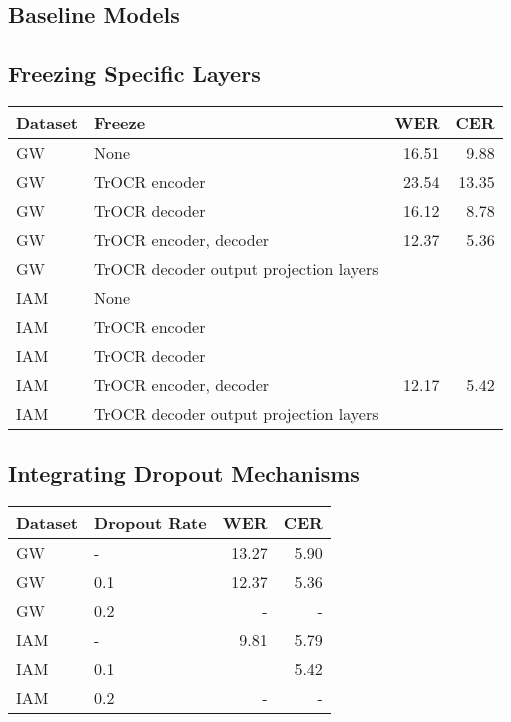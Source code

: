 \subsection{Baseline Models}
\label{subsec:5_baseline_models}
\subsection{Freezing Specific Layers}
\label{subsec:5_freezing_specific_layers}
\begin{tabular}{l|l||r|r}
    Dataset	& Freeze	& WER	& CER		\\
    \hline
    \hline
    GW		& None		& 16.51	& 9.88	\\
    GW		& TrOCR encoder		& 23.54	& 13.35	\\
    GW	& TrOCR decoder	& 16.12	& 8.78	\\
    GW	& TrOCR encoder, decoder	& 12.37	& 5.36	\\
    GW	& TrOCR decoder output projection layers	&  &  	\\
    \hline
    IAM		& None		& 	& 	\\
    IAM		& TrOCR encoder		& 	& \\
    IAM	& TrOCR decoder	& & 	\\
    IAM	& TrOCR encoder, decoder	& 12.17	& 5.42	\\
    IAM	& TrOCR decoder output projection layers	&  &  	\\
    \hline
    \end{tabular}
\subsection{Integrating Dropout Mechanisms}
\label{subsec:5_integrating_dropout_mechanisms}
\begin{tabular}{l|l||r|r}
    Dataset	& Dropout Rate	& WER	& CER		\\
    \hline
    \hline
    GW		& -		& 13.27	& 5.90	\\
    GW		& 0.1		& 12.37 & 5.36	\\
    GW		& 0.2	& - & -	\\
    \hline
    IAM		& -		& 9.81	& 5.79	\\
    IAM		& 0.1		& 	& 5.42	\\
    IAM		& 0.2	& - & -	\\
    \end{tabular}

